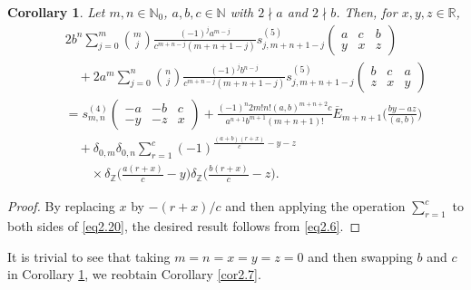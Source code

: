 \documentclass[reqno]{amsart}
\numberwithin{equation}{section}
\newtheorem{corollary}[thm]{Corollary}
\begin{document}
\begin{corollary}\label{cor2.9} Let $m,n\in\mathbb{N}_{0}$, $a,b,c\in\mathbb{N}$ with $2\nmid a$ and $2\nmid b$. Then, for $x,y,z\in\mathbb{R}$,
\begin{eqnarray}\label{eq2.21}
&&2b^{n}\sum_{j=0}^{m}\binom{m}{j}\frac{(-1)^{j}a^{m-j}}{c^{m+n-j}(m+n+1-j)}s_{j,m+n+1-j}^{(5)}\left(
\begin{matrix}
a & c & b \\
y & x & z
\end{matrix}
\right)\nonumber\\
&&\quad+2a^{m}\sum_{j=0}^{n}\binom{n}{j}\frac{(-1)^{j}b^{n-j}}{c^{m+n-j}(m+n+1-j)}s_{j,m+n+1-j}^{(5)}\left(
\begin{matrix}
b & c & a \\
z & x & y
\end{matrix}
\right)\nonumber\\
&&=s_{m,n}^{(4)}\left(
\begin{matrix}
-a & -b & c \\
-y & -z & x
\end{matrix}
\right)+\frac{(-1)^{n}2m!n!(a,b)^{m+n+2}c}{a^{n+1}b^{m+1}(m+n+1)!}\overline{E}_{m+n+1}\biggl(\frac{by-az}{(a,b)}\biggl)\nonumber\\
&&\quad+\delta_{0,m}\delta_{0,n}\sum_{r=1}^{c}(-1)^{\frac{(a+b)(r+x)}{c}-y-z}\nonumber\\
&&\qquad\times\delta_{\mathbb{Z}}\biggl(\frac{a(r+x)}{c}-y\biggl)
\delta_{\mathbb{Z}}\biggl(\frac{b(r+x)}{c}-z\biggl).
\end{eqnarray}
\end{corollary}

\begin{proof}
By replacing $x$ by $-(r+x)/c$ and then applying the operation $\sum_{r=1}^{c}$ to both sides of \eqref{eq2.20}, the desired result follows from \eqref{eq2.6}.
\end{proof}

It is trivial to see that taking $m=n=x=y=z=0$ and then swapping $b$ and $c$ in Corollary \ref{cor2.9}, we reobtain Corollary \ref{cor2.7}.
\end{document}
